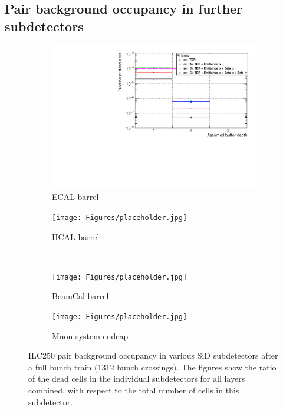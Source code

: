  \subsection{Pair background occupancy in further \sid subdetectors}

\begin{figure}
 \centering
  \begin{subfigure}[b]{0.49\textwidth}
   \centering
    \includegraphics[width=\textwidth]{Figures/Pairs/Appendix/Occupancy_Comparison_All_layers_deadcells_ILC250_ALL_SETS_ECALBarrel.pdf}
   \caption{\sid ECAL barrel}
   \end{subfigure}
   \hfill
     \begin{subfigure}[b]{0.49\textwidth}
   \centering
    \texttt{[image: Figures/placeholder.jpg]}
   \caption{\sid HCAL barrel}
   \end{subfigure}\\
     \begin{subfigure}[b]{0.49\textwidth}
   \centering
    \texttt{[image: Figures/placeholder.jpg]}
   \caption{\sid BeamCal barrel}
   \end{subfigure}
   \hfill
    \begin{subfigure}[b]{0.49\textwidth}
   \centering
    \texttt{[image: Figures/placeholder.jpg]}
   \caption{\sid Muon system endcap}
   \end{subfigure}
   \caption[Pair background occupancy in various \sid subdetectors for the ILC250]{ILC250 pair background occupancy in various SiD subdetectors after a full bunch train (1312 bunch crossings).
   The figures show the ratio of the dead cells in the individual subdetectors for all layers combined, with respect to the total number of cells in this subdetector.
   }
   \label{fig:PairBkg:ILC250_Occupancy_Further_detectors}
\end{figure}

